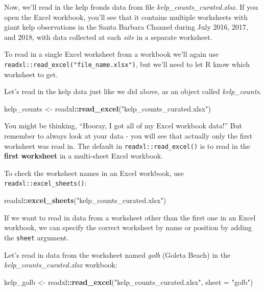 \documentclass[]{book}
\newenvironment{Shaded}{\begin{snugshade}}{\end{snugshade}}
\newcommand{\DataTypeTok}[1]{\textcolor[rgb]{0.13,0.29,0.53}{#1}}
\newcommand{\KeywordTok}[1]{\textcolor[rgb]{0.13,0.29,0.53}{\textbf{#1}}}
\newcommand{\NormalTok}[1]{#1}
\newcommand{\OperatorTok}[1]{\textcolor[rgb]{0.81,0.36,0.00}{\textbf{#1}}}
\newcommand{\StringTok}[1]{\textcolor[rgb]{0.31,0.60,0.02}{#1}}
\begin{document}
Now, we'll read in the kelp fronds data from file \emph{kelp\_counts\_curated.xlsx}. If you open the Excel workbook, you'll see that it contains multiple worksheets with giant kelp observations in the Santa Barbara Channel during July 2016, 2017, and 2018, with data collected at each \emph{site} in a separate worksheet.

To read in a single Excel worksheet from a workbook we'll again use \texttt{readxl::read\_excel("file\_name.xlsx")}, but we'll need to let R know which worksheet to get.

Let's read in the kelp data just like we did above, as an object called \emph{kelp\_counts}.

\begin{Shaded}
\begin{Highlighting}[]
\NormalTok{kelp_counts <-}\StringTok{ }\NormalTok{readxl}\OperatorTok{::}\KeywordTok{read_excel}\NormalTok{(}\StringTok{"kelp_counts_curated.xlsx"}\NormalTok{)}
\end{Highlighting}
\end{Shaded}

You might be thinking, ``Hooray, I got all of my Excel workbook data!'' But remember to always look at your data - you will see that actually only the first worksheet was read in. The default in \texttt{readxl::read\_excel()} is to read in the \textbf{first worksheet} in a multi-sheet Excel workbook.

To check the worksheet names in an Excel workbook, use \texttt{readxl::excel\_sheets()}:

\begin{Shaded}
\begin{Highlighting}[]
\NormalTok{readxl}\OperatorTok{::}\KeywordTok{excel_sheets}\NormalTok{(}\StringTok{"kelp_counts_curated.xlsx"}\NormalTok{)}
\end{Highlighting}
\end{Shaded}

If we want to read in data from a worksheet other than the first one in an Excel workbook, we can specify the correct worksheet by name or position by adding the \texttt{sheet} argument.

Let's read in data from the worksheet named \emph{golb} (Goleta Beach) in the \emph{kelp\_counts\_curated.xlsx} workbook:

\begin{Shaded}
\begin{Highlighting}[]
\NormalTok{kelp_golb <-}\StringTok{ }\NormalTok{readxl}\OperatorTok{::}\KeywordTok{read_excel}\NormalTok{(}\StringTok{"kelp_counts_curated.xlsx"}\NormalTok{, }\DataTypeTok{sheet =} \StringTok{"golb"}\NormalTok{)}
\end{Highlighting}
\end{Shaded}
\end{document}
